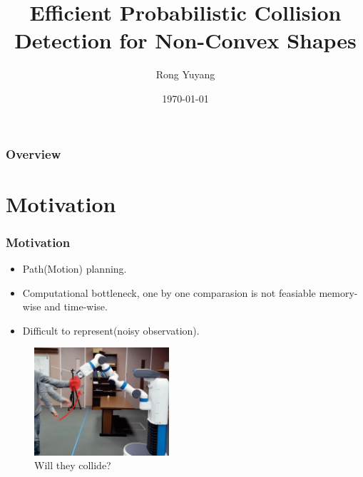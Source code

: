 \documentclass{beamer}
\title[Non-Convex shape Collision Detection]{Efficient Probabilistic Collision Detection for Non-Convex Shapes} %
\author{Rong Yuyang} %
\institute[UCDavis] %
{
University of California, Davis \\ %
\medskip
\textit{PtrRong@ucdavis.edu} %
}
\date{\today} %
\begin{document}
\begin{frame}
	\titlepage %
\end{frame}

\begin{frame}
	\frametitle{Overview} %
	\tableofcontents %
\end{frame}


\section{Motivation} %


\begin{frame}
	\frametitle{Motivation}
	\begin{itemize}
		\item Path(Motion) planning.
		\item Computational bottleneck, one by one comparasion is not feasiable memory-wise and time-wise.
		\item Difficult to represent(noisy observation).
	\end{itemize}
	\begin{figure}
		\includegraphics[width=5cm]{imgs/PS.png}
		\caption{Will they collide?}
	\end{figure}
\end{frame}
\end{document}
